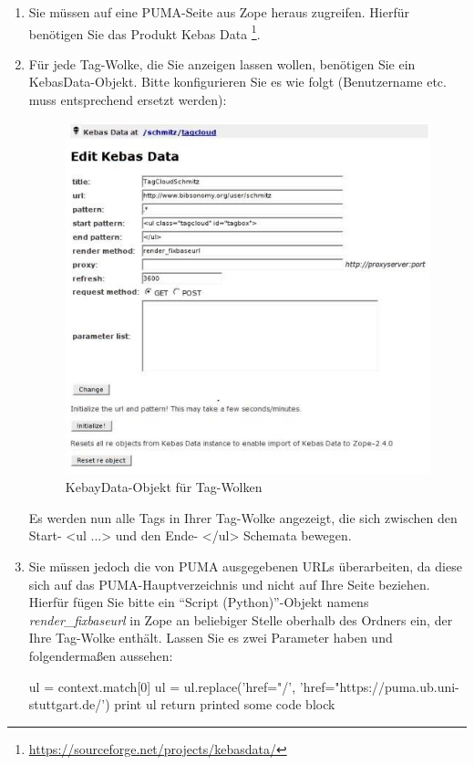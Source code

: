\begin{enumerate}
    \item Sie müssen auf eine PUMA-Seite aus Zope heraus zugreifen. Hierfür benötigen Sie das Produkt Kebas Data \footnote{\url{https://sourceforge.net/projects/kebasdata/}}.
    \item Für jede Tag-Wolke, die Sie anzeigen lassen wollen, benötigen Sie ein KebasData-Objekt. Bitte konfigurieren Sie es wie folgt (Benutzername etc. muss entsprechend ersetzt werden):
  
\begin{figure}[h!]
 \centering
 \includegraphics[width=11cm]{Bilder/tag_wolken}
 \caption{KebayData-Objekt für Tag-Wolken}
 \label{figure116}
\end{figure}

    Es werden nun alle Tags in Ihrer Tag-Wolke angezeigt, die sich zwischen den Start- <ul ...> und den Ende- </ul> Schemata bewegen.
    \item Sie müssen jedoch die von PUMA ausgegebenen URLs überarbeiten, da diese sich auf das PUMA-Hauptverzeichnis und nicht auf Ihre Seite beziehen. Hierfür fügen Sie bitte ein \enquote{Script (Python)}-Objekt namens \textit{render\_fixbaseurl} in Zope an beliebiger Stelle oberhalb des Ordners ein, der Ihre Tag-Wolke enthält. Lassen Sie es zwei Parameter haben und folgendermaßen aussehen: 

    ul = context.match[0]\newline
    ul = ul.replace('href="/', 'href="https://puma.ub.uni-stuttgart.de/')\newline
    print ul\newline
    return printed\newline
    some code block


\end{enumerate}
